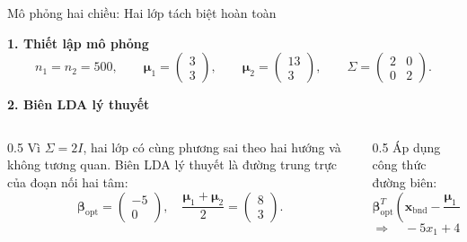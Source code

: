 \documentclass{beamer}
\begin{document}
\begin{frame}{Mô phỏng hai chiều: Hai lớp tách biệt hoàn toàn}
	\scriptsize
	\setlength{\abovedisplayskip}{3pt}
	\setlength{\belowdisplayskip}{3pt}
	
	\textbf{1. Thiết lập mô phỏng}
	\[
	n_1=n_2=500,\qquad
	\bm{\mu}_1=
	\begin{pmatrix}
		3\\
		3
	\end{pmatrix},
	\qquad
	\bm{\mu}_2=
	\begin{pmatrix}
		13\\
		3
	\end{pmatrix},
	\qquad
	\Sigma=
	\begin{pmatrix}
		2 & 0\\
		0 & 2
	\end{pmatrix}.
	\]
	
	\textbf{2. Biên LDA lý thuyết}
	\begin{columns}[T]
		\begin{column}{0.5\textwidth}
			Vì \(\Sigma=2I\), hai lớp có cùng phương sai theo hai hướng và không tương quan. Biên LDA lý thuyết là đường trung trực của đoạn nối hai tâm:
			\[
			\bm{\beta}_{\text{opt}} = \begin{pmatrix} -5\\ 0 \end{pmatrix}, \quad
			\frac{\bm{\mu}_1+\bm{\mu}_2}{2} = \begin{pmatrix} 8\\ 3 \end{pmatrix}.
			\]
		\end{column}
		\begin{column}{0.5\textwidth}
			Áp dụng công thức đường biên:
			\[
			\bm{\beta}_{\text{opt}}^T
			\left(
			\bm{x}_{\text{bnd}} - \frac{\bm{\mu}_1+\bm{\mu}_2}{2}
			\right)
			=0
			\]
			\[
			\Rightarrow \quad -5x_1+40=0 \quad \Rightarrow \quad \boxed{x_1=8}.
			\]
		\end{column}
	\end{columns}
	

\end{frame}
\end{document}
